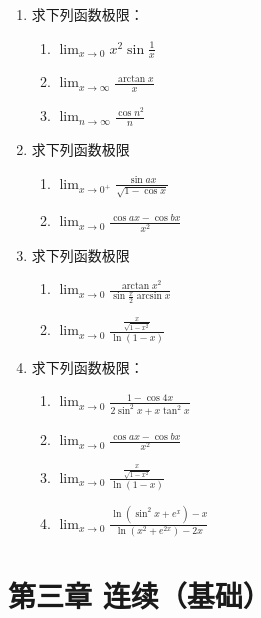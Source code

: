\documentclass[12pt, a4paper]{article}
\begin{document}
\begin{enumerate}
    \item 求下列函数极限：
    \begin{enumerate}
        \item $ \lim_{x\to0}x^{2}\sin\frac{1}{x} $
        \item $ \lim_{x\to\infty}\frac{\arctan x}{x} $
        \item $ \lim_{n\to\infty}\frac{\cos n^{2}}{n} $
    \end{enumerate}
    \item 求下列函数极限
    \begin{enumerate}
        \item $ \lim_{x \to 0^{+}} \frac{\sin ax}{\sqrt{1 - \cos x}} $
        \item $ \lim_{x \to 0} \frac{\cos ax - \cos bx}{x^{2}} $
    \end{enumerate}

    \item 求下列函数极限
    \begin{enumerate}
        \item $ \lim_{x\to0} \frac{\arctan x^{2}}{\sin\frac{x}{2}\arcsin x} $
        \item $ \lim_{x \to 0} \frac{\frac{x}{\sqrt{1-x^{2}}}}{\ln(1-x)} $
    \end{enumerate}

    \item 求下列函数极限：
    \begin{enumerate}
        \item $ \lim_{x\to0}\frac{1-\cos 4x}{2\sin^{2}x+x\tan^{2}x} $
        \item $ \lim_{x \to 0} \frac{\cos ax - \cos bx}{x^{2}} $
        \item $ \lim_{x\to0}\frac{\frac{x}{\sqrt{1-x^{2}}}}{\ln(1-x)} $
        \item $ \lim_{x\to0}\frac{\ln(\sin^{2}x+e^{x})-x}{\ln(x^{2}+e^{2x})-2x} $
    \end{enumerate}
\end{enumerate}

\section*{第三章 连续（基础）}
\end{document}
